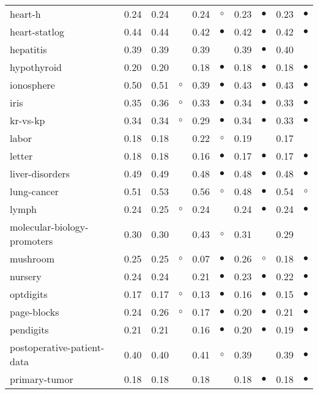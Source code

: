 {\begin{longtable}{lrr@{\hspace{0.1cm}}cr@{\hspace{0.1cm}}cr@{\hspace{0.1cm}}cr@{\hspace{0.1cm}}c}
heart-h & 0.24 & 0.24 &           & 0.24 &   $\circ$ & 0.23 & $\bullet$ & 0.23 & $\bullet$\\
heart-statlog & 0.44 & 0.44 &           & 0.42 & $\bullet$ & 0.42 & $\bullet$ & 0.42 & $\bullet$\\
hepatitis & 0.39 & 0.39 &           & 0.39 &           & 0.39 & $\bullet$ & 0.40 &          \\
hypothyroid & 0.20 & 0.20 &           & 0.18 & $\bullet$ & 0.18 & $\bullet$ & 0.18 & $\bullet$\\
ionosphere & 0.50 & 0.51 &   $\circ$ & 0.39 & $\bullet$ & 0.43 & $\bullet$ & 0.43 & $\bullet$\\
iris & 0.35 & 0.36 &   $\circ$ & 0.33 & $\bullet$ & 0.34 & $\bullet$ & 0.33 & $\bullet$\\
kr-vs-kp & 0.34 & 0.34 &   $\circ$ & 0.29 & $\bullet$ & 0.34 & $\bullet$ & 0.33 & $\bullet$\\
labor & 0.18 & 0.18 &           & 0.22 &   $\circ$ & 0.19 &           & 0.17 &          \\
letter & 0.18 & 0.18 &           & 0.16 & $\bullet$ & 0.17 & $\bullet$ & 0.17 & $\bullet$\\
liver-disorders & 0.49 & 0.49 &           & 0.48 & $\bullet$ & 0.48 & $\bullet$ & 0.48 & $\bullet$\\
lung-cancer & 0.51 & 0.53 &           & 0.56 &   $\circ$ & 0.48 & $\bullet$ & 0.54 &   $\circ$\\
lymph & 0.24 & 0.25 &   $\circ$ & 0.24 &           & 0.24 & $\bullet$ & 0.24 & $\bullet$\\
molecular-biology-promoters & 0.30 & 0.30 &           & 0.43 &   $\circ$ & 0.31 &           & 0.29 &          \\
mushroom & 0.25 & 0.25 &   $\circ$ & 0.07 & $\bullet$ & 0.26 &   $\circ$ & 0.18 & $\bullet$\\
nursery & 0.24 & 0.24 &           & 0.21 & $\bullet$ & 0.23 & $\bullet$ & 0.22 & $\bullet$\\
optdigits & 0.17 & 0.17 &   $\circ$ & 0.13 & $\bullet$ & 0.16 & $\bullet$ & 0.15 & $\bullet$\\
page-blocks & 0.24 & 0.26 &   $\circ$ & 0.17 & $\bullet$ & 0.20 & $\bullet$ & 0.21 & $\bullet$\\
pendigits & 0.21 & 0.21 &           & 0.16 & $\bullet$ & 0.20 & $\bullet$ & 0.19 & $\bullet$\\
postoperative-patient-data & 0.40 & 0.40 &           & 0.41 &   $\circ$ & 0.39 &           & 0.39 & $\bullet$\\
primary-tumor & 0.18 & 0.18 &           & 0.18 &           & 0.18 & $\bullet$ & 0.18 & $\bullet$\\

\end{longtable}}
